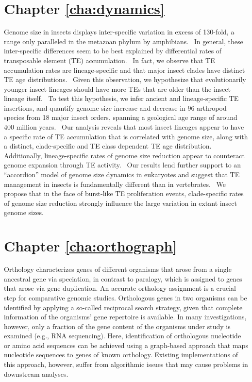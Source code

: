 \section*{Chapter \ref{cha:dynamics}}

Genome size in insects displays inter-specific variation in excess of
130-fold, a range only paralleled in the metazoan phylum by amphibians.~
In general, these inter-specific differences seem to be best explained
by differential rates of transposable element (TE) accumulation.~ In
fact, we observe that TE accumulation rates are lineage-specific and
that major insect clades have distinct TE age distributions.~ Given this
observation, we hypothesize that evolutionarily younger insect lineages
should have more TEs that are older than the insect lineage itself.~ To
test this hypothesis, we infer ancient and lineage-specific TE
insertions, and quantify genome size increase and decrease in 96
arthropod species from 18 major insect orders, spanning a geological age
range of around 400 million years.~ Our analysis reveals that most
insect lineages appear to have a specific rate of TE accumulation that
is correlated with genome size, along with a distinct, clade-specific
and TE class dependent TE age distribution.~ Additionally,
lineage-specific rates of genome size reduction appear to counteract
genome expansion through TE activity.~ Our results lend further support
to an ``accordion'' model of genome size dynamics in eukaryotes and
suggest that TE management in insects is fundamentally different than in
vertebrates.~ We propose that in the face of burst-like TE proliferation
events, clade-specific rates of genome size reduction strongly influence
the large variation in extant insect genome sizes.%

\section*{Chapter \ref{cha:orthograph}}

Orthology characterizes genes of different organisms that arose from a
single ancestral gene via speciation, in contrast to paralogy, which is
assigned to genes that arose via gene duplication. An accurate orthology
assignment is a crucial step for comparative genomic studies.
Orthologous genes in two organisms can be identified by applying a
so-called reciprocal search strategy, given that complete information of
the organisms' gene repertoire is available. In many investigations,
however, only a fraction of the gene content of the organisms under
study is examined (e.g., RNA sequencing).  Here, identification of
orthologous nucleotide or amino acid sequences can be achieved using a
graph-based approach that maps nucleotide sequences to genes of known
orthology. Existing implementations of this approach, however, suffer
from algorithmic issues that may cause problems in downstream analyses.

